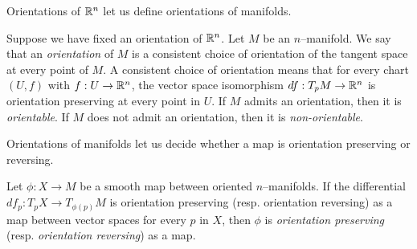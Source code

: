 Orientations of $\mathbb{R}^n$ let us define orientations of manifolds.

\begin{defn}
	Suppose we have fixed an orientation of $\mathbb{R}^n$.
	Let $M$ be an $n$--manifold.
	We say that an \emph{orientation} of $M$ is a consistent choice of orientation of the tangent space at every point of $M$.
	A consistent choice of orientation means that for every chart $(U,f)$ with $f:U\to\mathbb{R}^n$, the vector space isomorphism $df:T_p M\to \mathbb{R}^n$ is orientation preserving at every point in $U$. 
	If $M$ admits an orientation, then it is \emph{orientable}.
	If $M$ does not admit an orientation, then it is \emph{non-orientable}.	
\end{defn}

Orientations of manifolds let us decide whether a map is orientation preserving or reversing.

\begin{defn}
	Let $\phi:X\to M$ be a smooth map between oriented $n$--manifolds.
	If the differential $df_p:T_p X\to T_{\phi(p)} M$ is orientation preserving (resp. orientation reversing) as a map between vector spaces for every $p$ in $X$, then $\phi$ is \emph{orientation preserving} (resp. \emph{orientation reversing}) as a map.
\end{defn}
